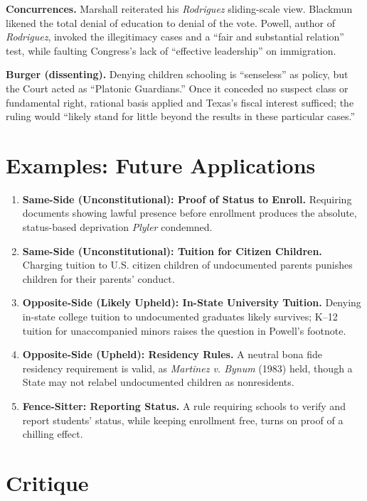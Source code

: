 \documentclass[12pt]{article}
\begin{document}
\textbf{Concurrences.} Marshall reiterated his \textit{Rodriguez} sliding-scale view. Blackmun likened the total denial of education to denial of the vote. Powell, author of \textit{Rodriguez}, invoked the illegitimacy cases and a ``fair and substantial relation'' test, while faulting Congress's lack of ``effective leadership'' on immigration.

\textbf{Burger (dissenting).} Denying children schooling is ``senseless'' as policy, but the Court acted as ``Platonic Guardians.'' Once it conceded no suspect class or fundamental right, rational basis applied and Texas's fiscal interest sufficed; the ruling would ``likely stand for little beyond the results in these particular cases.''

\section{Examples: Future Applications}

\begin{enumerate}
\item \textbf{Same-Side (Unconstitutional): Proof of Status to Enroll.} Requiring documents showing lawful presence before enrollment produces the absolute, status-based deprivation \textit{Plyler} condemned.
\item \textbf{Same-Side (Unconstitutional): Tuition for Citizen Children.} Charging tuition to U.S. citizen children of undocumented parents punishes children for their parents' conduct.
\item \textbf{Opposite-Side (Likely Upheld): In-State University Tuition.} Denying in-state college tuition to undocumented graduates likely survives; K--12 tuition for unaccompanied minors raises the question in Powell's footnote.
\item \textbf{Opposite-Side (Upheld): Residency Rules.} A neutral bona fide residency requirement is valid, as \textit{Martinez v. Bynum} (1983) held, though a State may not relabel undocumented children as nonresidents.
\item \textbf{Fence-Sitter: Reporting Status.} A rule requiring schools to verify and report students' status, while keeping enrollment free, turns on proof of a chilling effect.
\end{enumerate}

\section{Critique}
\end{document}
